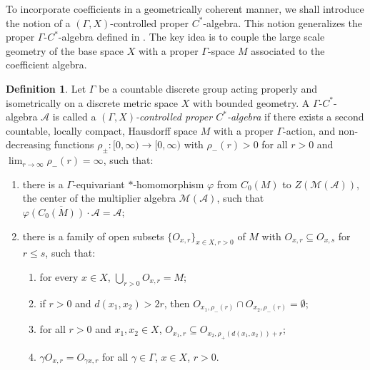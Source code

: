 \documentclass[pdflatex]{sn-jnl}
\theoremstyle{plain}
\theoremstyle{definition}
\newtheorem{definition}[theorem]{Definition}
\begin{document}
To incorporate coefficients in a geometrically coherent manner, we shall introduce the notion of a $(\Gamma, X)$-controlled proper $C^{*}$-algebra. This notion generalizes the proper $\Gamma$-$C^{*}$-algebra defined in \cite{GLWZ23}. The key idea is to couple the large scale geometry of the base space $X$ with a proper $\Gamma$-space $M$ associated to the coefficient algebra.
\begin{definition}\label{def:proper-Gamma-X-algebra}
Let $\Gamma$ be a countable discrete group acting properly and isometrically on a discrete metric space $X$ with bounded geometry. 
A $\Gamma$-$C^{*}$-algebra $\mathcal{A}$ is called a \emph{$(\Gamma, X)$-controlled proper $C^{*}$-algebra} if there exists a second countable, locally compact, Hausdorff space $M$ with a proper $\Gamma$-action, and non-decreasing functions
$\rho_{\pm}\colon[0,\infty)\to[0,\infty)$ with $\rho_-(r)>0$ for all $r>0$
and $\lim_{r\to\infty}\rho_-(r)=\infty$, such that:
\begin{enumerate}
\item[(1)] there is a $\Gamma$-equivariant $*$-homomorphism $\varphi$ from $C_0(M)$ to $Z(\mathcal{M}(\mathcal{A}))$,
the center of the multiplier 
algebra $\mathcal{M}(\mathcal{A})$, such that
$\overline{\varphi(C_0(M))\cdot\mathcal{A}}=\mathcal{A}$;
\item[(2)]there is a family of open subsets $\{O_{x,r}\}_{x\in X,r>0}$ of $M$ with $O_{x,r}\subseteq O_{x,s}$ for $r\le s$, such that:
\begin{enumerate}
\item[(a)] for every $x\in X$, $\bigcup_{r>0}O_{x,r}=M$;
\item[(b)] if $r>0$ and $d(x_1,x_2)>2r$, then $O_{x_1,\rho_-(r)}\cap O_{x_2,\rho_-(r)}=\emptyset$;
\item[(c)] for all $r>0$ and $x_1,x_2\in X$, $O_{x_1,r}\subseteq O_{x_2,\rho_+(d(x_1,x_2))+r}$;
\item[(d)] $\gamma O_{x,r}=O_{\gamma x,r}$ for all $\gamma\in\Gamma$, $x\in X$, $r>0$.
\end{enumerate}
\end{enumerate}
\end{definition}
\end{document}
